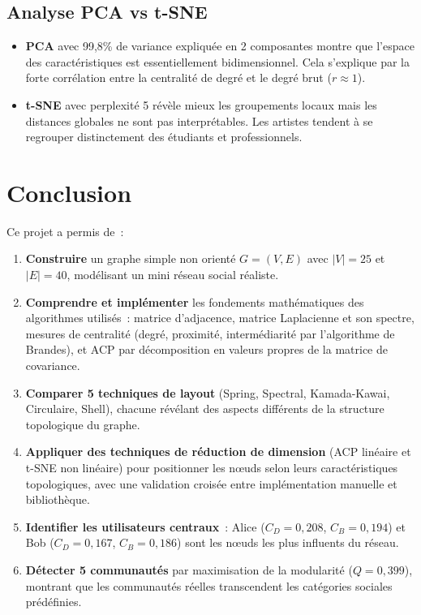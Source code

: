 \documentclass[12pt,a4paper]{article}
\begin{document}
\subsection{Analyse PCA vs t-SNE}

\begin{itemize}
    \item \textbf{PCA} avec 99,8\% de variance expliquée en 2 composantes montre que l'espace des caractéristiques est essentiellement bidimensionnel. Cela s'explique par la forte corrélation entre la centralité de degré et le degré brut ($r \approx 1$).
    \item \textbf{t-SNE} avec perplexité 5 révèle mieux les groupements locaux mais les distances globales ne sont pas interprétables. Les artistes tendent à se regrouper distinctement des étudiants et professionnels.
\end{itemize}

\section{Conclusion}
\label{sec:conclusion}

Ce projet a permis de~:

\begin{enumerate}
    \item \textbf{Construire} un graphe simple non orienté $G = (V, E)$ avec $|V| = 25$ et $|E| = 40$, modélisant un mini réseau social réaliste.

    \item \textbf{Comprendre et implémenter} les fondements mathématiques des algorithmes utilisés~: matrice d'adjacence, matrice Laplacienne et son spectre, mesures de centralité (degré, proximité, intermédiarité par l'algorithme de Brandes), et ACP par décomposition en valeurs propres de la matrice de covariance.

    \item \textbf{Comparer 5 techniques de layout} (Spring, Spectral, Kamada-Kawai, Circulaire, Shell), chacune révélant des aspects différents de la structure topologique du graphe.

    \item \textbf{Appliquer des techniques de réduction de dimension} (ACP linéaire et t-SNE non linéaire) pour positionner les n\oe{}uds selon leurs caractéristiques topologiques, avec une validation croisée entre implémentation manuelle et bibliothèque.

    \item \textbf{Identifier les utilisateurs centraux}~: Alice ($C_D = 0{,}208$, $C_B = 0{,}194$) et Bob ($C_D = 0{,}167$, $C_B = 0{,}186$) sont les n\oe{}uds les plus influents du réseau.

    \item \textbf{Détecter 5 communautés} par maximisation de la modularité ($Q = 0{,}399$), montrant que les communautés réelles transcendent les catégories sociales prédéfinies.
\end{enumerate}
\end{document}

